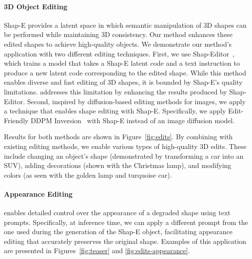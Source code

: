 \vspace{-12pt}
\paragraph{3D Object Editing}


Shap-E provides a latent space in which semantic manipulation of 3D shapes can be performed while maintaining 3D consistency. Our method enhances these edited shapes to achieve high-quality objects. We demonstrate our method's application with two different editing techniques.
First, we use Shap-Editor~\cite{chen2023shapeditor}, which trains a model that takes a Shap-E latent code and a text instruction to produce a new latent code corresponding to the edited shape. While this method enables diverse and fast editing of 3D shapes, it is bounded by Shap-E's quality limitations. \ourname{} addresses this limitation by enhancing the results produced by Shap-Editor.
Second, inspired by diffusion-based editing methods for images, we apply a technique that enables shape editing with Shap-E. Specifically, we apply Edit-Friendly DDPM Inversion~\cite{huberman2024edit} with Shap-E instead of an image diffusion model.

Results for both methods are shown in Figure~\ref{fig:edits}. By combining \ourname{} with existing editing methods, we enable various types of high-quality 3D edits. These include changing an object's shape (demonstrated by transforming a car into an SUV), adding decorations (shown with the Christmas lamp), and modifying colors (as seen with the golden lamp and turquoise car).


\vspace{-16pt}
\paragraph{Appearance Editing} \label{sec:app-edit}
\ourname{} enables detailed control over the appearance of a degraded shape using text prompts. Specifically, at inference time, we can apply a different prompt from the one used during the generation of the Shap-E object, facilitating appearance editing that accurately preserves the original shape. Examples of this application are presented in Figures~\ref{fig:teaser} and \ref{fig:edits-appearance}.

% 


\vspace{-14pt}

